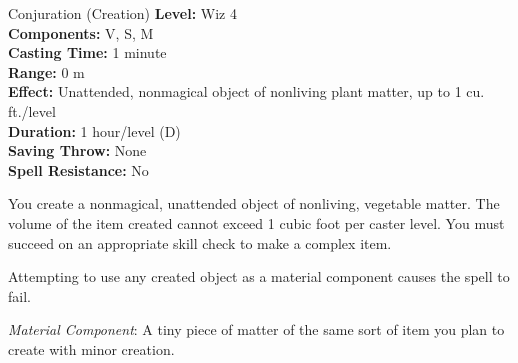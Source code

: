 {Conjuration (Creation)}
{
	\textbf{Level:}
	Wiz 4\\
	\textbf{Components:}
	V, S, M\\
	\textbf{Casting Time:}
	1 minute\\
	\textbf{Range:}
	0 m\\
	\textbf{Effect:}
	Unattended, nonmagical object of nonliving plant matter, up to 1 cu. ft./level\\
	\textbf{Duration:}
	1 hour/level (D)\\
	\textbf{Saving Throw:}
	None\\
	\textbf{Spell Resistance:}
	No\\
}
{
	You create a nonmagical, unattended object of nonliving, vegetable matter. The volume of the item created cannot exceed 1 cubic foot per caster level. You must succeed on an appropriate skill check to make a complex item.

	Attempting to use any created object as a material component causes the spell to fail.

	\textit{Material Component}:
	A tiny piece of matter of the same sort of item you plan to create with minor creation.

}
